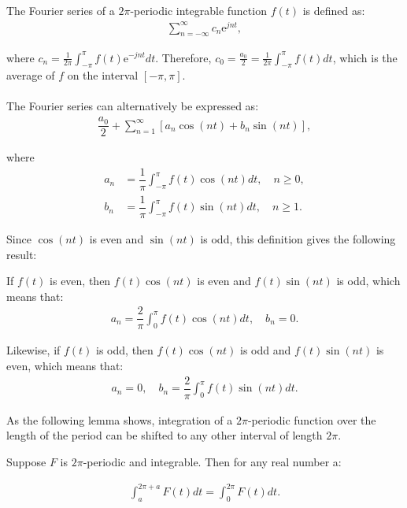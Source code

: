 \begin{definition} \label{def:fourier_definition}
The Fourier series of a $2\pi$-periodic integrable function $f(t)$ is defined as:
\begin{align*}
	\sum_{n=-\infty}^\infty c_n \text{e}^{j n t},
\end{align*}

where $c_n = \frac{1}{2\pi}\int_{- \pi}^\pi f(t) \text{e}^{-j n t} dt$. Therefore, $c_0 = \frac{a_0}{2} = \frac{1}{2\pi} \int_{-\pi}^\pi f(t) dt$, which is the average of $f$ on the interval $[-\pi,\pi]$.
\\ \\
The Fourier series can alternatively be expressed as:
\begin{align*}
	\dfrac{a_0}{2} + \sum_{n=1}^{\infty} \left[ a_n \cos(n t) + 	b_n \sin(n t)\right],
\end{align*}

where
\begin{align*}
	a_n 
	&= \dfrac{1}{\pi} \int_{-\pi}^\pi f(t) \cos (n t) dt, \quad 	n \geq 0, \\
	b_n
	&= \dfrac{1}{\pi} \int_{-\pi}^\pi f(t) \sin (n t) dt, \quad 	n \geq 1.
\end{align*}
\end{definition}

Since $\cos(nt)$ is even and $\sin(nt)$ is odd, this definition gives the following result:
\begin{lemma}
If $f(t)$ is even, then $f(t)\cos(nt)$ is even and $f(t)\sin(nt)$ is odd, which means that:
\begin{align*}
a_n = \dfrac{2}{\pi} \int_0^\pi f(t) \cos(nt) dt, \quad b_n = 0.
\end{align*}

Likewise, if $f(t)$ is odd, then $f(t)\cos(nt)$ is odd and $f(t)\sin(nt)$ is even, which means that:
\begin{align*}
a_n = 0, \quad b_n = \dfrac{2}{\pi} \int_0^\pi f(t) \sin(nt) dt.
\end{align*}
\end{lemma}

As the following lemma shows, integration of a $2\pi$-periodic function over the length of the period can be shifted to any other interval of length $2\pi$.

\begin{lemma}\label{lemma:2pi-periodic_function}
Suppose $F$ is $2\pi$-periodic and integrable. Then for any real number a:

\begin{align}
\int_a^{2\pi+a}F(t) dt = \int_0^{2\pi}F(t)dt.
\end{align}
\end{lemma}

